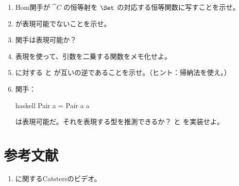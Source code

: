 \begin{enumerate}
  \tightlist
  \item
        Hom関手が $\cat{C}$ の恒等射を $\Set$ の対応する恒等関数に写すことを示せ。
  \item
         が表現可能でないことを示せ。
  \item
         関手は表現可能か？
  \item
         表現を使って、引数を二乗する関数をメモ化せよ。
  \item
         に対する  と  が互いの逆であることを示せ。（ヒント：帰納法を使え。）
  \item
        関手：

        \begin{snip}{haskell}
Pair a = Pair a a
\end{snip}
        は表現可能だ。それを表現する型を推測できるか？ と  を実装せよ。
\end{enumerate}

\section{参考文献}

\begin{enumerate}
  \tightlist
  \item
        に関するCatstersのビデオ。
\end{enumerate}
